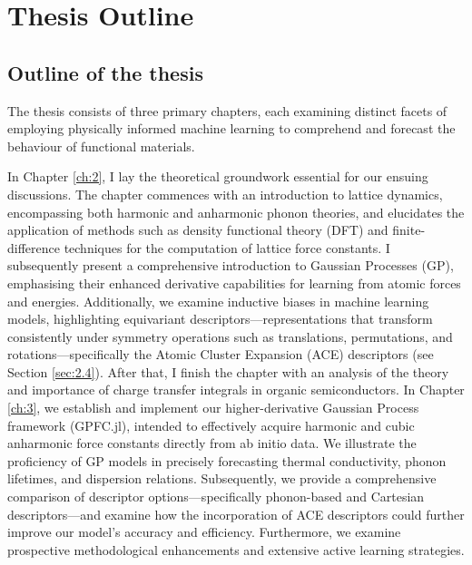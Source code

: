 
\section{Thesis Outline}
\label{sec:1.2}
 
\subsection*{Outline of the thesis}

The thesis consists of three primary chapters, each examining distinct facets of employing physically informed machine learning to comprehend and forecast the behaviour of functional materials.

In Chapter \ref{ch:2}, I lay the theoretical groundwork essential for our ensuing discussions.  The chapter commences with an introduction to lattice dynamics, encompassing both harmonic and anharmonic phonon theories, and elucidates the application of methods such as density functional theory (DFT) and finite-difference techniques for the computation of lattice force constants.  I subsequently present a comprehensive introduction to Gaussian Processes (GP), emphasising their enhanced derivative capabilities for learning from atomic forces and energies.  Additionally, we examine inductive biases in machine learning models, highlighting equivariant descriptors—representations that transform consistently under symmetry operations such as translations, permutations, and rotations—specifically the Atomic Cluster Expansion (ACE) descriptors (see Section \ref{sec:2.4}). After that, I finish the chapter with an analysis of the theory and importance of charge transfer integrals in organic semiconductors.
  In Chapter \ref{ch:3}, we establish and implement our higher-derivative Gaussian Process framework (GPFC.jl), intended to effectively acquire harmonic and cubic anharmonic force constants directly from ab initio data. We illustrate the proficiency of GP models in precisely forecasting thermal conductivity, phonon lifetimes, and dispersion relations. Subsequently, we provide a comprehensive comparison of descriptor options—specifically phonon-based and Cartesian descriptors—and examine how the incorporation of ACE descriptors could further improve our model's accuracy and efficiency.  Furthermore, we examine prospective methodological enhancements and extensive active learning strategies.


